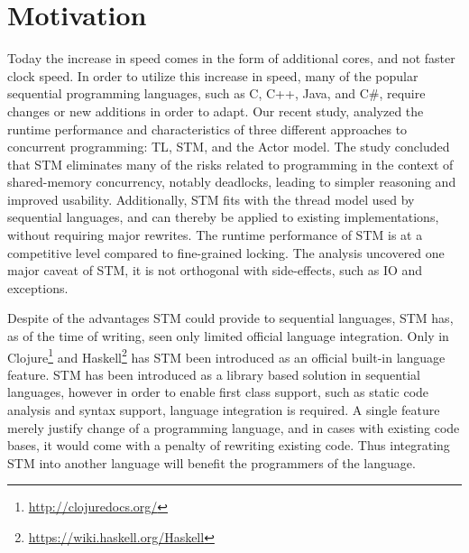 \makeatletter {}\makeatother
{}
%
\label{chap:introduction}
\section{Motivation}
Today the increase in  speed comes in the form of additional cores, and not faster clock speed\cite{sutter2005free}. In order to utilize this increase in speed, many of the popular sequential programming languages, such as C, C++, Java, and C\#, require changes or new additions in order to adapt\cite[p. 56]{sutter2005software}. Our recent study\cite{dpt907e14trending}, analyzed the runtime performance and characteristics of three different approaches to concurrent programming: \ac{TL}, \ac{STM}, and the Actor model. The study concluded that \ac{STM} eliminates many of the risks related to programming in the context of shared-memory concurrency, notably deadlocks, leading to simpler reasoning and improved usability. Additionally, \ac{STM} fits with the thread model used by sequential languages, and can thereby be applied to existing implementations, without requiring major rewrites. The runtime performance of \ac{STM} is at a competitive level compared to fine-grained locking\cite{dpt907e14trending}. The analysis uncovered one major caveat of \ac{STM}, it is not orthogonal with side-effects, such as \ac{IO} and exceptions\cite{dpt907e14trending}.

Despite of the advantages \ac{STM} could provide to sequential languages, \ac{STM} has, as of the time of writing, seen only limited official language integration. Only in Clojure\footnote{\url{http://clojuredocs.org/}} and Haskell\footnote{\url{https://wiki.haskell.org/Haskell}} has \ac{STM} been introduced as an official built-in language feature. \ac{STM} has been introduced as a library based solution in sequential languages, however in order to enable first class support, such as static code analysis and syntax support, language integration is required.  A single feature merely justify change of a programming language, and in cases with existing code bases, it would come with a penalty of rewriting existing code. Thus integrating \ac{STM} into another language will benefit the programmers of the language.

